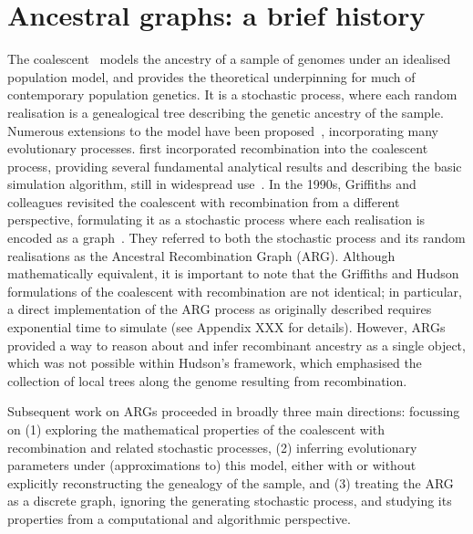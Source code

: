 \documentclass{article}
\begin{document}
\section*{Ancestral graphs: a brief history}
The coalescent~\citep{kingman1982coalescent,kingman1982genealogy,
hudson1983testing, tajima1983evolutionary} models the ancestry of a sample of
genomes under an idealised population model, and provides the theoretical
underpinning for much of contemporary population genetics.
It is a stochastic process, where each random realisation
is a genealogical tree describing the genetic ancestry of the sample.
Numerous extensions to the model have been
proposed~\citep{hudson1990gene,hein2004gene,wakely2008coalescent},
incorporating many evolutionary processes.
\citet{hudson1983properties}
first incorporated recombination into the coalescent process,
providing several fundamental analytical results
and describing the basic simulation algorithm, still in
widespread use~\citep{hudson2002generating,kelleher2016efficient,
baumdicker2021efficient}.
In the 1990s, Griffiths and colleagues revisited the
coalescent with recombination from a different perspective,
formulating it as a stochastic process where each realisation
is encoded as a graph~\citep{griffiths1991two,ethier1990two,
griffiths1996ancestral,griffiths1997ancestral}.
They referred to both the stochastic process and
its random realisations as the Ancestral Recombination Graph (ARG).
Although mathematically equivalent, it is
important to note that the Griffiths and Hudson formulations of
the coalescent with recombination are not identical;
in particular, a direct implementation of the ARG process
as originally described requires exponential time to simulate
(see Appendix XXX for details). However, ARGs provided a way
to reason about and infer recombinant ancestry as a single object,
which was not possible within Hudson's framework, which emphasised
the collection of local trees along the genome resulting from recombination.

Subsequent work on ARGs proceeded in broadly three main directions: focussing on (1)
exploring the mathematical properties of the coalescent with recombination and
related stochastic processes, (2) inferring evolutionary parameters under
(approximations to) this model, either with or without explicitly reconstructing the
genealogy of the sample, and (3) treating the ARG as a discrete graph, ignoring the
generating stochastic process, and studying its properties from a computational and
algorithmic perspective.
\end{document}
